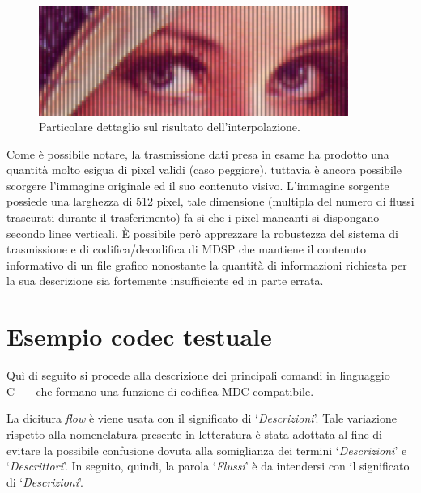 \begin{figure}[ht]
\includegraphics[width=0.90\textwidth]{../images/occhi.png}
\centering \caption{Particolare dettaglio sul risultato dell'interpolazione.}
	\label{fig:occhi}
\end{figure}
Come è possibile notare, la trasmissione dati presa in esame ha prodotto una
quantità molto esigua di pixel validi (caso peggiore), tuttavia è ancora
possibile scorgere l'immagine originale ed il suo contenuto visivo. L'immagine sorgente possiede
una larghezza di 512 pixel, tale dimensione (multipla del numero di flussi
trascurati durante il trasferimento) fa sì che i pixel mancanti si dispongano
secondo linee verticali. \`E possibile però apprezzare la robustezza del
sistema di trasmissione e di codifica/decodifica di MDSP che mantiene il contenuto informativo di un file
grafico nonostante la quantità di informazioni richiesta per la sua descrizione
sia fortemente insufficiente ed in parte errata.


\section{Esempio codec testuale}
\label{sec:esempio_codec}
Quì di seguito si procede alla descrizione dei principali comandi in linguaggio
C++ che formano una funzione di codifica MDC compatibile.

\begin{notabene}
La dicitura \textit{flow} è viene usata con il significato di
`\emph{Descrizioni}'. Tale variazione rispetto alla nomenclatura presente in
letteratura è stata adottata al fine di evitare la possibile confusione dovuta
alla somiglianza dei termini `\emph{Descrizioni}' e `\emph{Descrittori}'. In seguito, quindi, la parola `\emph{Flussi}' è da intendersi con il significato di `\emph{Descrizioni}'.
\end{notabene}

